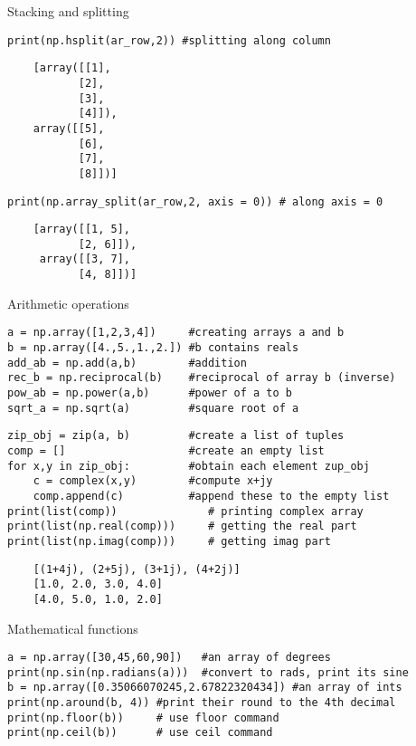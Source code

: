 \documentclass{beamer}
\begin{document}
\begin{frame}[fragile]{Stacking and splitting}

\begin{lstlisting}
print(np.hsplit(ar_row,2)) #splitting along column
\end{lstlisting}



\begin{tiny}
\begin{verbatim}
    [array([[1],
           [2],
           [3],
           [4]]),
    array([[5],
           [6],
           [7],
           [8]])]
\end{verbatim}
\end{tiny}


\begin{lstlisting}
print(np.array_split(ar_row,2, axis = 0)) # along axis = 0
\end{lstlisting}

\begin{tiny}
\begin{verbatim}
    [array([[1, 5],
           [2, 6]]), 
     array([[3, 7],
           [4, 8]])]
\end{verbatim}
\end{tiny}

\end{frame}
\begin{frame}[fragile]{Arithmetic operations}
\begin{lstlisting}
a = np.array([1,2,3,4])     #creating arrays a and b
b = np.array([4.,5.,1.,2.]) #b contains reals
add_ab = np.add(a,b)        #addition 
rec_b = np.reciprocal(b)    #reciprocal of array b (inverse)
pow_ab = np.power(a,b)      #power of a to b
sqrt_a = np.sqrt(a)         #square root of a
\end{lstlisting}
\begin{lstlisting}
zip_obj = zip(a, b)         #create a list of tuples
comp = []                   #create an empty list
for x,y in zip_obj:         #obtain each element zup_obj
    c = complex(x,y)        #compute x+jy  
    comp.append(c)          #append these to the empty list
print(list(comp))              # printing complex array
print(list(np.real(comp)))     # getting the real part
print(list(np.imag(comp)))     # getting imag part 
\end{lstlisting}
\begin{tiny}
\begin{verbatim}
    [(1+4j), (2+5j), (3+1j), (4+2j)]
    [1.0, 2.0, 3.0, 4.0]
    [4.0, 5.0, 1.0, 2.0]
\end{verbatim}
\end{tiny}
\end{frame}
\begin{frame}[fragile]{Mathematical functions}
\begin{lstlisting}
a = np.array([30,45,60,90])   #an array of degrees
print(np.sin(np.radians(a)))  #convert to rads, print its sine
b = np.array([0.35066070245,2.67822320434]) #an array of ints
print(np.around(b, 4)) #print their round to the 4th decimal
print(np.floor(b))     # use floor command
print(np.ceil(b))      # use ceil command
\end{lstlisting}
\end{frame}
\end{document}
